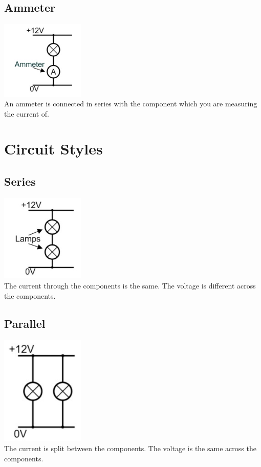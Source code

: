 \documentclass[a4paper,11pt, twocolumn]{article}
\begin{document}
\subsection{Ammeter}
\includegraphics[width=0.3\textwidth]{ammeter.jpg}\\
An ammeter is connected in series with the component which you are measuring the current of.

\section{Circuit Styles}
\subsection{Series}
\includegraphics[width=0.3\textwidth]{series.jpg}\\
The current through the components is the same. The voltage is different across the components.
\subsection{Parallel}
\includegraphics[width=0.3\textwidth]{parallel.jpg}\\
The current is split between the components. The voltage is the same across the components.
\end{document}

